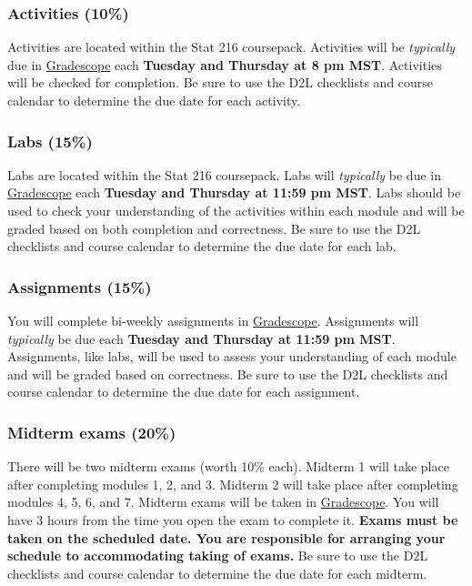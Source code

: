 \documentclass[
]{article}
\begin{document}
\subsubsection{Activities (10\%)}\label{activities-10}

Activities are located within the Stat 216 coursepack. Activities will
be \emph{typically} due in
\href{https://www.gradescope.com/}{Gradescope} each \textbf{Tuesday and
Thursday at 8 pm MST}. Activities will be checked for completion. Be
sure to use the D2L checklists and course calendar to determine the due
date for each activity.

\subsubsection{Labs (15\%)}\label{labs-15}

Labs are located within the Stat 216 coursepack. Labs will
\emph{typically} be due in
\href{https://www.gradescope.com/}{Gradescope} each \textbf{Tuesday and
Thursday at 11:59 pm MST}. Labs should be used to check your
understanding of the activities within each module and will be graded
based on both completion and correctness. Be sure to use the D2L
checklists and course calendar to determine the due date for each lab.

\subsubsection{Assignments (15\%)}\label{assignments-15}

You will complete bi-weekly assignments in
\href{https://www.gradescope.com/}{Gradescope}. Assignments will
\emph{typically} be due each \textbf{Tuesday and Thursday at 11:59 pm
MST}. Assignments, like labs, will be used to assess your understanding
of each module and will be graded based on correctness. Be sure to use
the D2L checklists and course calendar to determine the due date for
each assignment.

\subsubsection{Midterm exams (20\%)}\label{midterm-exams-20}

There will be two midterm exams (worth 10\% each). Midterm 1 will take
place after completing modules 1, 2, and 3. Midterm 2 will take place
after completing modules 4, 5, 6, and 7. Midterm exams will be taken in
\href{https://www.gradescope.com/}{Gradescope}. You will have 3 hours
from the time you open the exam to complete it. \textbf{Exams must be
taken on the scheduled date. You are responsible for arranging your
schedule to accommodating taking of exams.} Be sure to use the D2L
checklists and course calendar to determine the due date for each
midterm.
\end{document}
